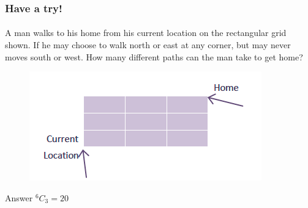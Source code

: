 \documentclass[
	11pt, %
]{beamer}
\begin{document}
\begin{frame}
	\frametitle{Have a try!}
	\framesubtitle{}
A man walks to his home from his current location on the rectangular grid shown. If
he may choose to walk north or east at any corner, but may never moves south or
west. How many different paths can the man take to get home?
	\begin{figure}
		\includegraphics[width=0.5\linewidth]{Man_Walk.png}
	\end{figure}
\bigskip
\pause
Answer \textbf{$^6 C_3 = 20$}
\bigskip
\end{frame}

\end{document}
